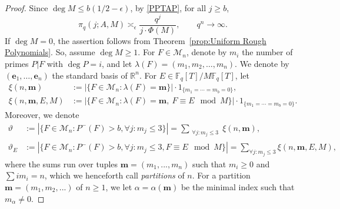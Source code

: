 \documentclass[12pt]{amsart}
\numberwithin{equation}{section}
\theoremstyle{definition}
\theoremstyle{remark}
\newcommand{\FF}{\mathbb{F}}
\begin{document}
\begin{proof}
    Since $\deg M \leq b(1/2-\epsilon)$, by \eqref{PPTAP}, for all $j \geq b$, 
    \begin{equation}\label{hypothesis on S}
        \pi_q(j;A,M) \asymp_{\epsilon} \frac{q^j}{j \cdot \Phi(M)}, \qquad q^n \to \infty.
    \end{equation}
    If $\deg M = 0$, the assertion follows from Theorem~\ref{prop:Uniform Rough Polynomials}. So, assume $\deg M \geq 1$.
    For $F \in \mathcal{M}_n$, denote by $m_i$ the number of primes $P|F$ with $\deg P = i$, and let $\lambda(F) = (m_1,m_2,\dots,m_n)$. We denote by $(\boldsymbol{e}_1, \ldots, \boldsymbol{e}_n)$ the standard basis of $\mathbb{R}^n$. 
    For $E \in \FF_q[T]/M\FF_q[T]$, let 
    \begin{align*}
        \xi(n,\boldsymbol{m}) &:= | \{F\in \mathcal{M}_n : \lambda(F) = \boldsymbol{m}\}|\cdot 1_{\{m_1=\cdots=m_{b}=0\}},\\
        \xi(n,\boldsymbol{m},E,M) &:= |\{F\in \mathcal{M}_n : \lambda(F) = \boldsymbol{m},\  F \equiv E \mod{M}\}|\cdot 1_{\{m_1=\cdots=m_{b}=0\}}.
    \end{align*}
    Moreover, we denote
    \begin{align*}
        \vartheta &:=|\{F \in \mathcal{M}_n: P^-(F)>b, \forall j: m_j \leq 3 \}|= \sum_{\substack{ \forall j: m_j\leq 3}} \xi(n,\boldsymbol{m})
        , \\
        \vartheta_E &:= |\{F \in \mathcal{M}_n: P^-(F)>b, \forall j: m_j \leq 3, F \equiv E \mod M \}|=\sum_{\forall j: m_j \leq 3} \xi(n,\boldsymbol{m},E,M) 
        ,
    \end{align*}
    where the sums run over tuples $\boldsymbol{m} = (m_1,...,m_n)$ such that $m_i\geq 0$ and $\sum im_i = n$, which we henceforth call \emph{partitions} of $n$. 
    For a partition $\boldsymbol{m} = (m_1,m_2,...)$ of $n\geq 1$, we let  $\alpha = \alpha(\boldsymbol{m})$ be the minimal index such that $m_\alpha \neq 0$.
    

\end{proof}
\end{document}
